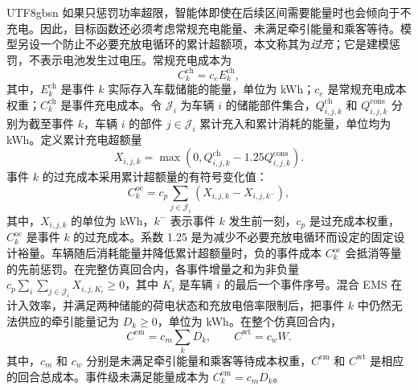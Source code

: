 \documentclass[conference]{IEEEtran}
\begin{document}
\begin{CJK*}{UTF8}{gbsn}
如果只惩罚功率超限，智能体即使在后续区间需要能量时也会倾向于不充电。因此，目标函数还必须考虑常规充电能量、未满足牵引能量和乘客等待。模型另设一个防止不必要充放电循环的累计超额项，本文称其为\emph{过充}；它是建模惩罚，不表示电池发生过电压。常规充电成本为
\begin{equation}
 C^{\mathrm{ch}}_k = c_e E^{\mathrm{ch}}_k,
\end{equation}
其中，$E^{\mathrm{ch}}_k$ 是事件 $k$ 实际存入车载储能的能量，单位为 kWh；$c_e$ 是常规充电成本权重；$C^{\mathrm{ch}}_k$ 是事件充电成本。令 $\mathcal{J}_i$ 为车辆 $i$ 的储能部件集合，$Q^{\mathrm{ch}}_{i,j,k}$ 和 $Q^{\mathrm{cons}}_{i,j,k}$ 分别为截至事件 $k$，车辆 $i$ 的部件 $j\in\mathcal{J}_i$ 累计充入和累计消耗的能量，单位均为 kWh。定义累计充电超额量
\begin{equation}
 X_{i,j,k}=\max\!\left(0,Q^{\mathrm{ch}}_{i,j,k}
 -1.25Q^{\mathrm{cons}}_{i,j,k}\right).
\end{equation}
事件 $k$ 的过充成本采用累计超额量的有符号变化值：
\begin{equation}
 C^{\mathrm{oc}}_k=c_p\sum_{j\in\mathcal{J}_i}
 \left(X_{i,j,k}-X_{i,j,k^-}\right),
\end{equation}
其中，$X_{i,j,k}$ 的单位为 kWh，$k^-$ 表示事件 $k$ 发生前一刻，$c_p$ 是过充成本权重，$C^{\mathrm{oc}}_k$ 是事件 $k$ 的过充成本。系数 1.25 是为减少不必要充放电循环而设定的固定设计裕量。车辆随后消耗能量并降低累计超额量时，负的事件成本 $C^{\mathrm{oc}}_k$ 会抵消等量的先前惩罚。在完整仿真回合内，各事件增量之和为非负量 $c_p\sum_i\sum_{j\in\mathcal{J}_i}X_{i,j,K_i}\geq0$，其中 $K_i$ 是车辆 $i$ 的最后一个事件序号。混合 EMS 在计入效率，并满足两种储能的荷电状态和充放电倍率限制后，把事件 $k$ 中仍然无法供应的牵引能量记为 $D_k\geq0$，单位为 kWh。在整个仿真回合内，
\begin{equation}
 C^{\mathrm{em}}=c_m\sum_kD_k,\qquad C^{\mathrm{wt}}=c_w W.
\end{equation}
其中，$c_m$ 和 $c_w$ 分别是未满足牵引能量和乘客等待成本权重，$C^{\mathrm{em}}$ 和 $C^{\mathrm{wt}}$ 是相应的回合总成本。事件级未满足能量成本为 $C^{\mathrm{em}}_k=c_mD_k$。


\end{CJK*}
\end{document}
